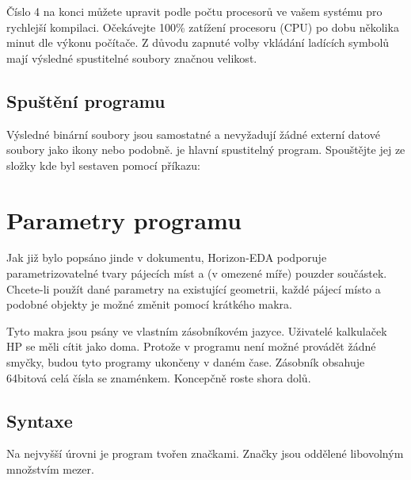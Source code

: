 \documentclass[letterpaper,10pt,czech]{sphinxmanual}
\begin{document}
Číslo 4 na konci můžete upravit podle počtu procesorů ve vašem systému pro rychlejší kompilaci. Očekávejte 100\% zatížení procesoru (CPU) po dobu několika minut dle výkonu počítače. Z důvodu zapnuté volby vkládání ladících symbolů mají výsledné spustitelné soubory značnou velikost.


\section{Spuštění programu}
\label{\detokenize{build-linux:spusteni-programu}}
Výsledné binární soubory jsou samostatné a nevyžadují žádné externí
datové soubory jako ikony nebo podobně.
 je hlavní spustitelný program. Spouštějte jej ze složky kde byl sestaven pomocí příkazu:

\begin{sphinxVerbatim}[commandchars=\\\{\}]
\end{sphinxVerbatim}


\chapter{Parametry programu}
\label{\detokenize{parameter-programs:parametry-programu}}\label{\detokenize{parameter-programs::doc}}
Jak již bylo popsáno jinde v dokumentu, Horizon-EDA podporuje parametrizovatelné tvary pájecích míst
a (v omezené míře) pouzder součástek. Chcete-li použít dané parametry na existující geometrii, každé pájecí místo a podobné objekty je možné změnit pomocí krátkého makra.

Tyto makra jsou psány ve vlastním zásobníkovém jazyce. Uživatelé kalkulaček HP se měli cítit jako doma. Protože v programu není možné provádět žádné smyčky, budou tyto programy ukončeny v daném čase. Zásobník obsahuje 64bitová celá čísla se znaménkem. Koncepčně roste shora dolů.


\section{Syntaxe}
\label{\detokenize{parameter-programs:syntaxe}}
Na nejvyšší úrovni je program tvořen značkami. Značky jsou oddělené libovolným množstvím mezer.
\end{document}
